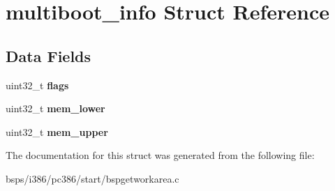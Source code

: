 \hypertarget{structmultiboot__info}{}\section{multiboot\+\_\+info Struct Reference}
\label{structmultiboot__info}
\subsection*{Data Fields}
\begin{DoxyCompactItemize}
\item 
\mbox{\label{structmultiboot__info_a33c78eb1aec2573f8293acf9a42fe2a8}} 
uint32\+\_\+t {\bfseries flags}
\item 
\mbox{\label{structmultiboot__info_a8c88b721d871cb57a51feb5cd5fbdb6c}} 
uint32\+\_\+t {\bfseries mem\+\_\+lower}
\item 
\mbox{\label{structmultiboot__info_a8ecb8953e55d1f6b75a3892cdc82a0b5}} 
uint32\+\_\+t {\bfseries mem\+\_\+upper}
\end{DoxyCompactItemize}


The documentation for this struct was generated from the following file\+:\begin{DoxyCompactItemize}
\item 
bsps/i386/pc386/start/bspgetworkarea.\+c\end{DoxyCompactItemize}
